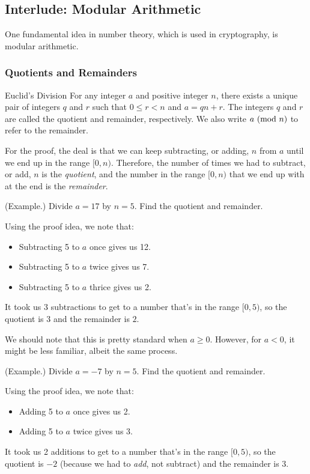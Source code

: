 \documentclass[letterpaper]{article}
\newcommand{\0}{\mathbf{0}}
\begin{document}
\subsection{Interlude: Modular Arithmetic}
One fundamental idea in number theory, which is used in cryptography, is modular arithmetic. 

\subsubsection{Quotients and Remainders}

\begin{lemma}{Euclid's Division}{}
    For any integer $a$ and positive integer $n$, there exists a unique pair of integers $q$ and $r$ such that $0 \leq r < n$ and $a = qn + r$. The integers $q$ and $r$ are called the quotient and remainder, respectively. We also write $a \ (\mathrm{mod}\ n)$ to refer to the remainder.
\end{lemma}
For the proof, the deal is that we can keep subtracting, or adding, $n$ from $a$ until we end up in the range $[0, n)$. Therefore, the number of times we had to subtract, or add, $n$ is the \emph{quotient}, and the number in the range $[0, n)$ that we end up with at the end is the \emph{remainder}. 

\begin{mdframed}
    (Example.) Divide $a = 17$ by $n = 5$. Find the quotient and remainder.
    
    \bigskip 

    Using the proof idea, we note that: 
    \begin{itemize}
        \item Subtracting 5 to $a$ once gives us 12. 
        \item Subtracting 5 to $a$ twice gives us 7.
        \item Subtracting 5 to $a$ thrice gives us 2.
    \end{itemize}
    It took us 3 subtractions to get to a number that's in the range $[0, 5)$, so the quotient is $\boxed{3}$ and the remainder is $\boxed{2}$. 
\end{mdframed}
We should note that this is pretty standard when $a \geq 0$. However, for $a < 0$, it might be less familiar, albeit the same process.

\begin{mdframed}
    (Example.) Divide $a = -7$ by $n = 5$. Find the quotient and remainder.

    \bigskip 

    Using the proof idea, we note that: 
    \begin{itemize}
        \item Adding 5 to $a$ once gives us 2.
        \item Adding 5 to $a$ twice gives us 3. 
    \end{itemize}
    It took us 2 additions to get to a number that's in the range $[0, 5)$, so the quotient is $\boxed{-2}$ (because we had to \emph{add}, not subtract) and the remainder is $\boxed{3}$. 
\end{mdframed}
\end{document}
